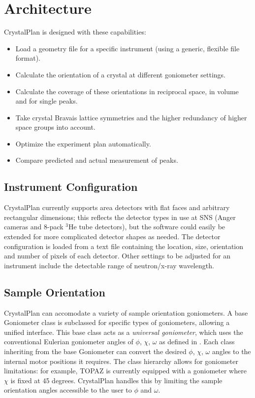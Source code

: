 \documentclass[final]{iucr}              %
\begin{document}
\section{Architecture}

CrystalPlan is designed with these capabilities:

\begin{itemize}
  \item Load a geometry file for a specific instrument (using a generic,
  flexible file format).
  \item Calculate the orientation of a crystal at different goniometer settings.
  \item Calculate the coverage of these orientations in reciprocal space,
  in volume and for single peaks.
  \item Take crystal Bravais lattice symmetries and the higher redundancy of
  higher space groups into account.
  \item Optimize the experiment plan automatically.
  \item Compare predicted and actual measurement of peaks.
\end{itemize}

\subsection{Instrument Configuration}

CrystalPlan currently supports area detectors with flat faces and arbitrary
rectangular dimensions; this reflects the detector types in use at SNS (Anger
cameras and 8-pack $^3$He tube detectors), but the software could easily be
extended for more complicated detector shapes as needed. The detector configuration is loaded from
a text file containing the location, size, orientation and number of pixels of
each detector. Other settings to be adjusted for an instrument include the
detectable range of neutron/x-ray wavelength.


\subsection{Sample Orientation}

CrystalPlan can accomodate a variety of sample
orientation goniometers. A base Goniometer class is subclassed for specific types of
goniometers, allowing a unified interface. This base class acts as a
\emph{universal goniometer},
which uses the conventional Eulerian goniometer angles of
$\phi$, $\chi$, $\omega$ as defined in \cite{busing67}.
Each class inheriting from the base Goniometer can convert
the desired $\phi$, $\chi$, $\omega$ angles to the internal motor positions it requires. 
The class hierarchy allows for goniometer limitations: for example, TOPAZ is
currently equipped with a goniometer where $\chi$ is fixed at 45 degrees.
CrystalPlan handles this by limiting the sample orientation angles accessible to the user to $\phi$ and
$\omega$.
    
\end{document}
